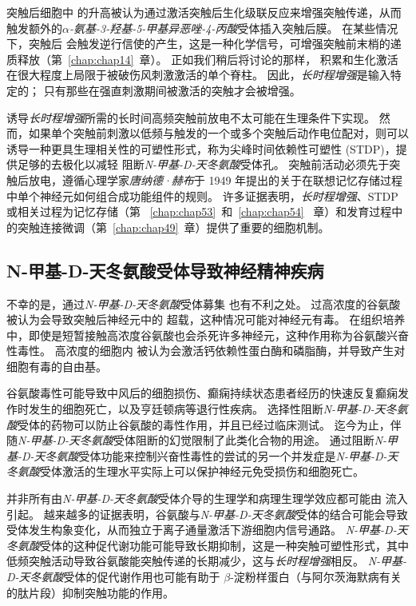 突触后细胞中  的升高被认为通过激活突触后生化级联反应来增强突触传递，从而触发额外的\textit{$\alpha$-氨基-3-羟基-5-甲基异恶唑-4-丙酸}受体插入突触后膜。
在某些情况下，突触后  会触发逆行信使的产生，这是一种化学信号，可增强突触前末梢的递质释放（第~\ref{chap:chap14}~章）。
正如我们稍后将讨论的那样， 积累和生化激活在很大程度上局限于被破伤风刺激激活的单个脊柱。
因此，\textit{长时程增强}是输入特定的；
只有那些在强直刺激期间被激活的突触才会被增强。


诱导\textit{长时程增强}所需的长时间高频突触前放电不太可能在生理条件下实现。
然而，如果单个突触前刺激以低频与触发的一个或多个突触后动作电位配对，则可以诱导一种更具生理相关性的可塑性形式，称为尖峰时间依赖性可塑性 (STDP)，提供足够的去极化以减轻  阻断\textit{N-甲基-D-天冬氨酸}受体孔。
突触前活动必须先于突触后放电，遵循心理学家\textit{唐纳德·赫布}于 1949 年提出的关于在联想记忆存储过程中单个神经元如何组合成功能组件的规则。 许多证据表明，\textit{长时程增强}、STDP 或相关过程为记忆存储（第 ~\ref{chap:chap53}~和~\ref{chap:chap54}~ 章）和发育过程中的突触连接微调（第~\ref{chap:chap49}~章）提供了重要的细胞机制。



\subsection{N-甲基-D-天冬氨酸受体导致神经精神疾病}

不幸的是，通过\textit{N-甲基-D-天冬氨酸}受体募集  也有不利之处。
过高浓度的谷氨酸被认为会导致突触后神经元中的  超载，这种情况可能对神经元有毒。
在组织培养中，即使是短暂接触高浓度谷氨酸也会杀死许多神经元，这种作用称为谷氨酸兴奋性毒性。
高浓度的细胞内  被认为会激活钙依赖性蛋白酶和磷脂酶，并导致产生对细胞有毒的自由基。


谷氨酸毒性可能导致中风后的细胞损伤、癫痫持续状态患者经历的快速反复癫痫发作时发生的细胞死亡，以及亨廷顿病等退行性疾病。
选择性阻断\textit{N-甲基-D-天冬氨酸}受体的药物可以防止谷氨酸的毒性作用，并且已经过临床测试。
迄今为止，伴随\textit{N-甲基-D-天冬氨酸}受体阻断的幻觉限制了此类化合物的用途。
通过阻断\textit{N-甲基-D-天冬氨酸}受体功能来控制兴奋性毒性的尝试的另一个并发症是\textit{N-甲基-D-天冬氨酸}受体激活的生理水平实际上可以保护神经元免受损伤和细胞死亡。


并非所有由\textit{N-甲基-D-天冬氨酸}受体介导的生理学和病理生理学效应都可能由  流入引起。
越来越多的证据表明，谷氨酸与\textit{N-甲基-D-天冬氨酸}受体的结合可能会导致受体发生构象变化，从而独立于离子通量激活下游细胞内信号通路。 
\textit{N-甲基-D-天冬氨酸}受体的这种促代谢功能可能导致长期抑制，这是一种突触可塑性形式，其中低频突触活动导致谷氨酸能突触传递的长期减少，这与\textit{长时程增强}相反。 
\textit{N-甲基-D-天冬氨酸}受体的促代谢作用也可能有助于 $\beta$-淀粉样蛋白（与阿尔茨海默病有关的肽片段）抑制突触功能的作用。


